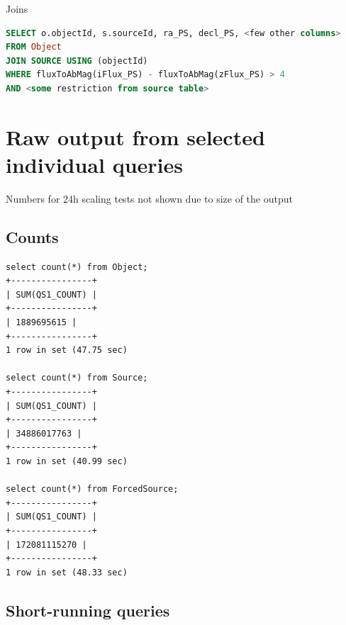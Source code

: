 \documentclass[DM,toc]{lsstdoc}
\begin{document}
Joins

\begin{lstlisting}[language=SQL]
SELECT o.objectId, s.sourceId, ra_PS, decl_PS, <few other columns>
FROM Object
JOIN SOURCE USING (objectId)
WHERE fluxToAbMag(iFlux_PS) - fluxToAbMag(zFlux_PS) > 4
AND <some restriction from source table> 
\end{lstlisting}

\section{Raw output from selected individual
queries}\label{raw-output-from-selected-individual-queries}

Numbers for 24h scaling tests not shown due to size of the output

\subsection{Counts}\label{counts}

\begin{verbatim}
select count(*) from Object;
+----------------+
| SUM(QS1_COUNT) |
+----------------+
| 1889695615 |
+----------------+
1 row in set (47.75 sec)
 
select count(*) from Source;
+----------------+
| SUM(QS1_COUNT) |
+----------------+
| 34886017763 |
+----------------+
1 row in set (40.99 sec)

select count(*) from ForcedSource;
+----------------+
| SUM(QS1_COUNT) |
+----------------+
| 172081115270 |
+----------------+
1 row in set (48.33 sec)
\end{verbatim}

\subsection{Short-running queries}\label{short-running-queries}
\end{document}
